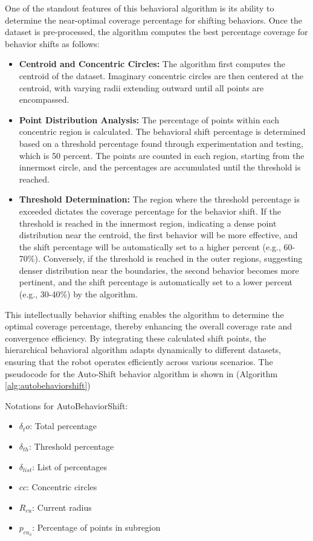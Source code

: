 One of the standout features of this behavioral algorithm is its ability to determine the near-optimal coverage percentage for shifting behaviors. Once the dataset is pre-processed, the algorithm computes the best percentage coverage for behavior shifts as follows:

\begin{itemize}
    \item \textbf{Centroid and Concentric Circles:  }The algorithm first computes the centroid of the dataset. Imaginary concentric circles are then centered at the centroid, with varying radii extending outward until all points are encompassed.
    \item \textbf{Point Distribution Analysis:  }The percentage of points within each concentric region is calculated. The behavioral shift percentage is determined based on a threshold percentage found through experimentation and testing, which is 50 percent. The points are counted in each region, starting from the innermost circle, and the percentages are accumulated until the threshold is reached.
    \item \textbf{Threshold Determination:  }The region where the threshold percentage is exceeded dictates the coverage percentage for the behavior shift. If the threshold is reached in the innermost region, indicating a dense point distribution near the centroid, the first behavior will be more effective, and the shift percentage will be automatically set to a higher percent (e.g., 60-70\%). Conversely, if the threshold is reached in the outer regions, suggesting denser distribution near the boundaries, the second behavior becomes more pertinent, and the shift percentage is automatically set to a lower percent (e.g., 30-40\%) by the algorithm.
\end{itemize} 

This intellectually behavior shifting enables the algorithm to determine the optimal coverage percentage, thereby enhancing the overall coverage rate and convergence efficiency. By integrating these calculated shift points, the hierarchical behavioral algorithm adapts dynamically to different datasets, ensuring that the robot operates efficiently across various scenarios. The pseudocode for the Auto-Shift behavior algorithm is shown in (Algorithm \autoref{alg:autobehaviorshift})


\vspace*{6mm}   


Notations for AutoBehaviorShift:
\begin{multicols}{2}
    \begin{itemize}[noitemsep,topsep=0pt]
        \item $\delta_to$: Total percentage
        \item $\delta_{th}$: Threshold percentage
        \item $\delta_{list}$: List of percentages
        \item $cc$: Concentric circles
        \item $R_{cu}$: Current radius
        \item $p_{cu_\delta}$: Percentage of points in subregion
    \end{itemize}
\end{multicols}

